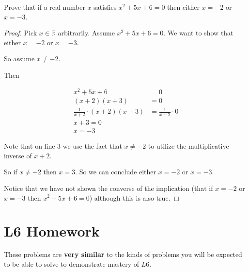 \begin{xca}
	Prove that if a real number $x$ satisfies $x^2 + 5x + 6 = 0$ then either $x=-2$ or $x=-3$.
	\end{xca}


\begin{proof}
		Pick $x \in \mathbb{R}$ arbitrarily. Assume $x^2 + 5x + 6 =0$.  We want to show that either $x=-2$ or $x=-3$.
		
		So assume $x \neq -2$.
		
		Then
		
		\begin{align}
			x^2 + 5x + 6 &=0\\
			(x+2)(x+3) &=0\\
			\frac{1}{x+2} \cdot (x+2)(x+3) &=\frac{1}{x+2} \cdot 0\\
			 x + 3 = 0\\
			 x = -3
		\end{align}
	
	Note that on line $3$ we use the fact that $x \neq -2$ to utilize the multiplicative inverse of $x+2$.
	
	So if $x \neq -2$ then $x=3$.  So we can conclude either $x = -2$ or $x = -3$.
	
	Notice that we have not shown the converse of the implication (that if $x = -2$ or $x=-3$ then $x^2 +5x + 6 = 0$) although this is also true.
	\end{proof}

\newpage

\section{L6 Homework}

 These problems are \textbf{very similar} to the kinds of problems you will be expected to be able to solve to demonstrate mastery of $L6$.
 

